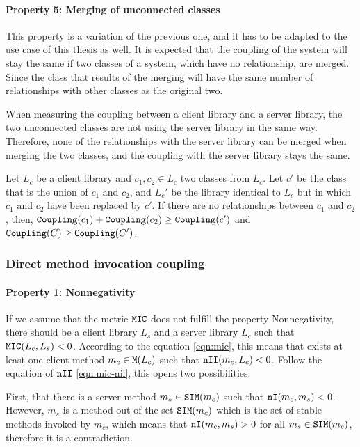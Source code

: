 \paragraph{Property 5: Merging of unconnected classes}
This property is a variation of the previous one, and it has to be adapted to the use case of this thesis as well. It is expected that the coupling of the system will stay the same if two classes of a system, which have no relationship, are merged. Since the class that results of the merging will have the same number of relationships with other classes as the original two.

When measuring the coupling between a client library and a server library, the two unconnected classes are not using the server library in the same way. Therefore, none of the relationships with the server library can be merged when merging the two classes, and the coupling with the server library stays the same.

Let $L_c$ be a client library and $c_1, c_2 \in L_c$ two classes from $L_c$. Let $c'$ be the class that is the union of  $c_1$ and $c_2$, and $L_c'$ be the library identical to $L_c$ but in which $c_1$ and $c_2$ have been replaced by $c'$. If there are no relationships between $c_1$ and $c_2$, then, $\verb|Coupling|(c_1) + \verb|Coupling|(c_2) \ge \verb|Coupling|(c')$ and $\verb|Coupling|(C) \ge \verb|Coupling|(C')$.

\subsubsection{Direct method invocation coupling}

\paragraph{Property 1: Nonnegativity}
If we assume that the metric $\verb|MIC|$ does not fulfill the property Nonnegativity, there should be a client library $L_s$ and a server library $L_c$ such that $\verb|MIC|(L_c, L_s) < 0$.
According to the equation \ref{eqn:mic}, this means that exists at least one client method $m_c \in \verb|M|(L_c)$ such that $\verb|nII|(m_c, L_c) < 0$. Follow the equation of $\verb|nII|$ \ref{eqn:mic-nii}, this opens two possibilities.

First, that there is a server method $m_s \in \verb|SIM|(m_c)$ such that $\verb|nI|(m_c, m_s) < 0$. However, $m_s$ is a method out of the set $\verb|SIM|(m_c)$ which is the set of stable methods invoked by $m_c$, which means that $\verb|nI|(m_c, m_s) > 0$ for all $m_s \in \verb|SIM|(m_c)$, therefore it is a contradiction.


